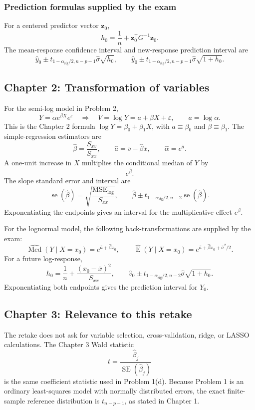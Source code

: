 \documentclass[11pt]{article}
\newcommand{\trans}{\mathsf T}
\newcommand{\E}{\operatorname{E}}
\newcommand{\se}{\operatorname{se}}
\newcommand{\SE}{\operatorname{SE}}
\begin{document}
\subsubsection*{Prediction formulas supplied by the exam}
For a centered predictor vector \(\bm z_0\),
\[
h_0=\frac1n+\bm z_0^\trans G^{-1}\bm z_0.
\]
The mean-response confidence interval and new-response prediction interval are
\[
\hat y_0\pm t_{1-\alpha_{\mathrm{sig}}/2,n-p-1}\hat\sigma\sqrt{h_0},
\qquad
\hat y_0\pm t_{1-\alpha_{\mathrm{sig}}/2,n-p-1}\hat\sigma\sqrt{1+h_0}.
\]

\subsection{Chapter 2: Transformation of variables}

For the semi-log model in Problem 2,
\[
Y=\alpha e^{\beta X}e^\varepsilon
\quad\Longrightarrow\quad
V=\log Y=a+\beta X+\varepsilon,
\qquad a=\log\alpha.
\]
This is the Chapter 2 formula
\(\log Y=\beta_0+\beta_1X\), with \(a\equiv\beta_0\) and
\(\beta\equiv\beta_1\). The simple-regression estimators are
\[
\hat\beta=\frac{S_{xv}}{S_{xx}},
\qquad
\hat a=\bar v-\hat\beta\bar x,
\qquad
\hat\alpha=e^{\hat a}.
\]
A one-unit increase in \(X\) multiplies the conditional median of \(Y\) by
\[
e^{\hat\beta}.
\]
The slope standard error and interval are
\[
\se(\hat\beta)=\sqrt{\frac{\mathrm{MSE}_{\log}}{S_{xx}}},
\qquad
\hat\beta\pm t_{1-\alpha_{\mathrm{sig}}/2,n-2}\se(\hat\beta).
\]
Exponentiating the endpoints gives an interval for the multiplicative effect
\(e^\beta\).

For the lognormal model, the following back-transformations are supplied by
the exam:
\[
\widehat{\operatorname{Med}}(Y\mid X=x_0)
=e^{\hat a+\hat\beta x_0},
\qquad
\widehat{\E}(Y\mid X=x_0)
=e^{\hat a+\hat\beta x_0+\hat\sigma^2/2}.
\]
For a future log-response,
\[
h_0=\frac1n+\frac{(x_0-\bar x)^2}{S_{xx}},
\qquad
\hat v_0\pm t_{1-\alpha_{\mathrm{sig}}/2,n-2}\hat\sigma\sqrt{1+h_0}.
\]
Exponentiating both endpoints gives the prediction interval for \(Y_0\).

\subsection{Chapter 3: Relevance to this retake}

The retake does not ask for variable selection, cross-validation, ridge, or
LASSO calculations. The Chapter 3 Wald statistic
\[
t=\frac{\hat\beta_j}{\SE(\hat\beta_j)}
\]
is the same coefficient statistic used in Problem 1(d). Because Problem 1 is
an ordinary least-squares model with normally distributed errors, the exact
finite-sample reference distribution is \(t_{n-p-1}\), as stated in Chapter 1.
\end{document}

